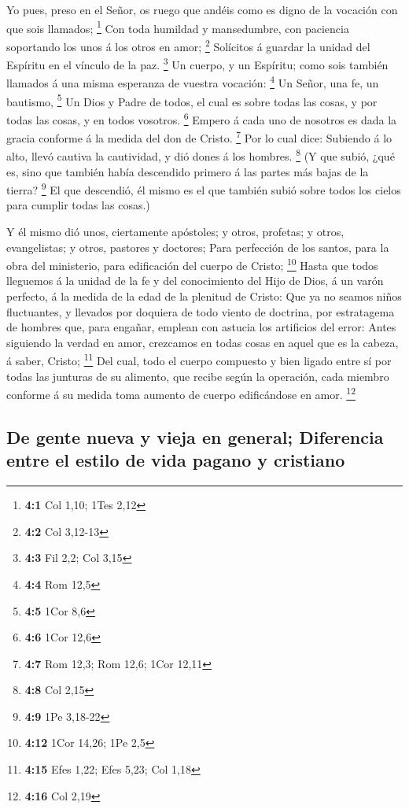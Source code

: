  Yo pues, preso en el Señor, os ruego que andéis como es
digno de la vocación con que sois llamados; \footnote{\textbf{4:1} Col
  1,10; 1Tes 2,12}  Con toda humildad y mansedumbre, con
paciencia soportando los unos á los otros en amor; \footnote{\textbf{4:2}
  Col 3,12-13}  Solícitos á guardar la unidad del Espíritu
en el vínculo de la paz. \footnote{\textbf{4:3} Fil 2,2; Col 3,15}
 Un cuerpo, y un Espíritu; como sois también llamados á
una misma esperanza de vuestra vocación: \footnote{\textbf{4:4} Rom 12,5}
 Un Señor, una fe, un bautismo, \footnote{\textbf{4:5}
  1Cor 8,6}  Un Dios y Padre de todos, el cual es sobre
todas las cosas, y por todas las cosas, y en todos vosotros. \footnote{\textbf{4:6}
  1Cor 12,6}  Empero á cada uno de nosotros es dada la
gracia conforme á la medida del don de Cristo. \footnote{\textbf{4:7}
  Rom 12,3; Rom 12,6; 1Cor 12,11}  Por lo cual dice:
Subiendo á lo alto, llevó cautiva la cautividad, y dió dones á los
hombres. \footnote{\textbf{4:8} Col 2,15}  (Y que subió,
¿qué es, sino que también había descendido primero á las partes más
bajas de la tierra? \footnote{\textbf{4:9} 1Pe 3,18-22} 
El que descendió, él mismo es el que también subió sobre todos los
cielos para cumplir todas las cosas.)

 Y él mismo dió unos, ciertamente apóstoles; y otros,
profetas; y otros, evangelistas; y otros, pastores y doctores;
 Para perfección de los santos, para la obra del
ministerio, para edificación del cuerpo de Cristo; \footnote{\textbf{4:12}
  1Cor 14,26; 1Pe 2,5}  Hasta que todos lleguemos á la
unidad de la fe y del conocimiento del Hijo de Dios, á un varón
perfecto, á la medida de la edad de la plenitud de Cristo:
 Que ya no seamos niños fluctuantes, y llevados por
doquiera de todo viento de doctrina, por estratagema de hombres que,
para engañar, emplean con astucia los artificios del error:
 Antes siguiendo la verdad en amor, crezcamos en todas
cosas en aquel que es la cabeza, á saber, Cristo; \footnote{\textbf{4:15}
  Efes 1,22; Efes 5,23; Col 1,18}  Del cual, todo el
cuerpo compuesto y bien ligado entre sí por todas las junturas de su
alimento, que recibe según la operación, cada miembro conforme á su
medida toma aumento de cuerpo edificándose en amor. \footnote{\textbf{4:16}
  Col 2,19}

\hypertarget{de-gente-nueva-y-vieja-en-general-diferencia-entre-el-estilo-de-vida-pagano-y-cristiano}{%
\subsection{De gente nueva y vieja en general; Diferencia entre el
estilo de vida pagano y
cristiano}\label{de-gente-nueva-y-vieja-en-general-diferencia-entre-el-estilo-de-vida-pagano-y-cristiano}}

